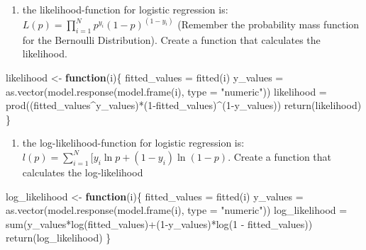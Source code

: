 \documentclass[
]{article}
\newenvironment{Shaded}{\begin{snugshade}}{\end{snugshade}}
\newcommand{\AttributeTok}[1]{\textcolor[rgb]{0.77,0.63,0.00}{#1}}
\newcommand{\ControlFlowTok}[1]{\textcolor[rgb]{0.13,0.29,0.53}{\textbf{#1}}}
\newcommand{\DecValTok}[1]{\textcolor[rgb]{0.00,0.00,0.81}{#1}}
\newcommand{\FunctionTok}[1]{\textcolor[rgb]{0.00,0.00,0.00}{#1}}
\newcommand{\NormalTok}[1]{#1}
\newcommand{\OtherTok}[1]{\textcolor[rgb]{0.56,0.35,0.01}{#1}}
\newcommand{\SpecialCharTok}[1]{\textcolor[rgb]{0.00,0.00,0.00}{#1}}
\newcommand{\StringTok}[1]{\textcolor[rgb]{0.31,0.60,0.02}{#1}}
\providecommand{\tightlist}{%
  \setlength{\itemsep}{0pt}\setlength{\parskip}{0pt}}
\begin{document}
\begin{enumerate}
\def\labelenumi{\roman{enumi}.}
\tightlist
\item
  the likelihood-function for logistic regression is:
  \(L(p)={\displaystyle\prod_{i=1}^Np^{y_i}(1-p)^{(1-y_i)}}\) (Remember
  the probability mass function for the Bernoulli Distribution). Create
  a function that calculates the likelihood.
\end{enumerate}

\begin{Shaded}
\begin{Highlighting}[]
\NormalTok{likelihood }\OtherTok{\textless{}{-}} \ControlFlowTok{function}\NormalTok{(i)\{}
\NormalTok{  fitted\_values }\OtherTok{=} \FunctionTok{fitted}\NormalTok{(i)}
\NormalTok{  y\_values }\OtherTok{=} \FunctionTok{as.vector}\NormalTok{(}\FunctionTok{model.response}\NormalTok{(}\FunctionTok{model.frame}\NormalTok{(i), }\AttributeTok{type =} \StringTok{"numeric"}\NormalTok{))}
\NormalTok{  likelihood }\OtherTok{=} \FunctionTok{prod}\NormalTok{((fitted\_values}\SpecialCharTok{\^{}}\NormalTok{y\_values)}\SpecialCharTok{*}\NormalTok{(}\DecValTok{1}\SpecialCharTok{{-}}\NormalTok{fitted\_values)}\SpecialCharTok{\^{}}\NormalTok{(}\DecValTok{1}\SpecialCharTok{{-}}\NormalTok{y\_values))}
  \FunctionTok{return}\NormalTok{(likelihood)}
\NormalTok{\}}
\end{Highlighting}
\end{Shaded}

\begin{enumerate}
\def\labelenumi{\roman{enumi}.}
\setcounter{enumi}{1}
\tightlist
\item
  the log-likelihood-function for logistic regression is:
  \(l(p) = {\displaystyle\sum_{i=1}^N}[y_i\ln{p}+(1-y_i)\ln{(1-p)}\).
  Create a function that calculates the log-likelihood
\end{enumerate}

\begin{Shaded}
\begin{Highlighting}[]
\NormalTok{log\_likelihood }\OtherTok{\textless{}{-}} \ControlFlowTok{function}\NormalTok{(i)\{}
\NormalTok{  fitted\_values }\OtherTok{=} \FunctionTok{fitted}\NormalTok{(i)}
\NormalTok{  y\_values }\OtherTok{=} \FunctionTok{as.vector}\NormalTok{(}\FunctionTok{model.response}\NormalTok{(}\FunctionTok{model.frame}\NormalTok{(i), }\AttributeTok{type =} \StringTok{"numeric"}\NormalTok{))}
\NormalTok{  log\_likelihood }\OtherTok{=} \FunctionTok{sum}\NormalTok{(y\_values}\SpecialCharTok{*}\FunctionTok{log}\NormalTok{(fitted\_values)}\SpecialCharTok{+}\NormalTok{(}\DecValTok{1}\SpecialCharTok{{-}}\NormalTok{y\_values)}\SpecialCharTok{*}\FunctionTok{log}\NormalTok{(}\DecValTok{1} \SpecialCharTok{{-}}\NormalTok{ fitted\_values))}
  \FunctionTok{return}\NormalTok{(log\_likelihood)}
\NormalTok{\}}
\end{Highlighting}
\end{Shaded}
\end{document}
